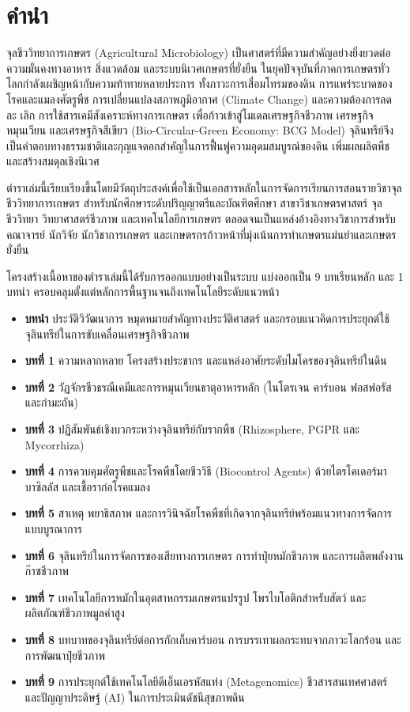 \chapter*{คำนำ}

จุลชีววิทยาการเกษตร (Agricultural Microbiology) เป็นศาสตร์ที่มีความสำคัญอย่างยิ่งยวดต่อความมั่นคงทางอาหาร สิ่งแวดล้อม และระบบนิเวศเกษตรที่ยั่งยืน ในยุคปัจจุบันที่ภาคการเกษตรทั่วโลกกำลังเผชิญหน้ากับความท้าทายหลายประการ ทั้งภาวะการเสื่อมโทรมของดิน การแพร่ระบาดของโรคและแมลงศัตรูพืช การเปลี่ยนแปลงสภาพภูมิอากาศ (Climate Change) และความต้องการลด ละ เลิก การใช้สารเคมีสังเคราะห์ทางการเกษตร เพื่อก้าวเข้าสู่โมเดลเศรษฐกิจชีวภาพ เศรษฐกิจหมุนเวียน และเศรษฐกิจสีเขียว (Bio-Circular-Green Economy: BCG Model) จุลินทรีย์จึงเป็นคำตอบทางธรรมชาติและกุญแจดอกสำคัญในการฟื้นฟูความอุดมสมบูรณ์ของดิน เพิ่มผลผลิตพืช และสร้างสมดุลเชิงนิเวศ

ตำราเล่มนี้เรียบเรียงขึ้นโดยมีวัตถุประสงค์เพื่อใช้เป็นเอกสารหลักในการจัดการเรียนการสอนรายวิชาจุลชีววิทยาการเกษตร สำหรับนักศึกษาระดับปริญญาตรีและบัณฑิตศึกษา สาขาวิชาเกษตรศาสตร์ จุลชีววิทยา วิทยาศาสตร์ชีวภาพ และเทคโนโลยีการเกษตร ตลอดจนเป็นแหล่งอ้างอิงทางวิชาการสำหรับคณาจารย์ นักวิจัย นักวิชาการเกษตร และเกษตรกรก้าวหน้าที่มุ่งเน้นการทำเกษตรแม่นยำและเกษตรยั่งยืน

โครงสร้างเนื้อหาของตำราเล่มนี้ได้รับการออกแบบอย่างเป็นระบบ แบ่งออกเป็น 9 บทเรียนหลัก และ 1 บทนำ ครอบคลุมตั้งแต่หลักการพื้นฐานจนถึงเทคโนโลยีระดับแนวหน้า
\begin{itemize}
    \item \textbf{บทนำ} ประวัติวิวัฒนาการ หมุดหมายสำคัญทางประวัติศาสตร์ และกรอบแนวคิดการประยุกต์ใช้จุลินทรีย์ในการขับเคลื่อนเศรษฐกิจชีวภาพ
    \item \textbf{บทที่ 1} ความหลากหลาย โครงสร้างประชากร และแหล่งอาศัยระดับไมโครของจุลินทรีย์ในดิน
    \item \textbf{บทที่ 2} วัฏจักรชีวธรณีเคมีและการหมุนเวียนธาตุอาหารหลัก (ไนโตรเจน คาร์บอน ฟอสฟอรัส และกำมะถัน)
    \item \textbf{บทที่ 3} ปฏิสัมพันธ์เชิงบวกระหว่างจุลินทรีย์กับรากพืช (Rhizosphere, PGPR และ Mycorrhiza)
    \item \textbf{บทที่ 4} การควบคุมศัตรูพืชและโรคพืชโดยชีววิธี (Biocontrol Agents) ด้วยไตรโคเดอร์มา บาซิลลัส และเชื้อราก่อโรคแมลง
    \item \textbf{บทที่ 5} สาเหตุ พยาธิสภาพ และการวินิจฉัยโรคพืชที่เกิดจากจุลินทรีย์พร้อมแนวทางการจัดการแบบบูรณาการ
    \item \textbf{บทที่ 6} จุลินทรีย์ในการจัดการของเสียทางการเกษตร การทำปุ๋ยหมักชีวภาพ และการผลิตพลังงานก๊าซชีวภาพ
    \item \textbf{บทที่ 7} เทคโนโลยีการหมักในอุตสาหกรรมเกษตรแปรรูป โพรไบโอติกสำหรับสัตว์ และผลิตภัณฑ์ชีวภาพมูลค่าสูง
    \item \textbf{บทที่ 8} บทบาทของจุลินทรีย์ต่อการกักเก็บคาร์บอน การบรรเทาผลกระทบจากภาวะโลกร้อน และการพัฒนาปุ๋ยชีวภาพ
    \item \textbf{บทที่ 9} การประยุกต์ใช้เทคโนโลยีดีเอ็นเอรหัสแท่ง (Metagenomics) ชีวสารสนเทศศาสตร์ และปัญญาประดิษฐ์ (AI) ในการประเมินดัชนีสุขภาพดิน
\end{itemize}

